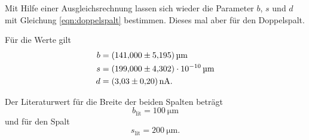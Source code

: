 \noindent Mit Hilfe einer Ausgleichsrechnung lassen sich wieder die Parameter $b$, $s$ und $d$ mit Gleichung \eqref{eqn:doppelspalt} bestimmen. Dieses mal aber für den Doppelspalt. 

\noindent Für die Werte gilt
\begin{align*}
    b &= \SI{141 \pm 5.195}{\micro\meter} \\
    s &= \SI{199\pm 4.302e-10}{\micro\meter} \\
    d &= \SI{3.03(20)}{\nano\ampere}. 
\end{align*}

\noindent Der Literaturwert für die Breite der beiden Spalten beträgt
\begin{equation*}
    b_{\text{lit}} = \SI{100}{\micro\meter}
\end{equation*}
und für den Spalt 
\begin{equation*}
    s_{\text{lit}} = \SI{200}{\micro\meter}.
\end{equation*}
